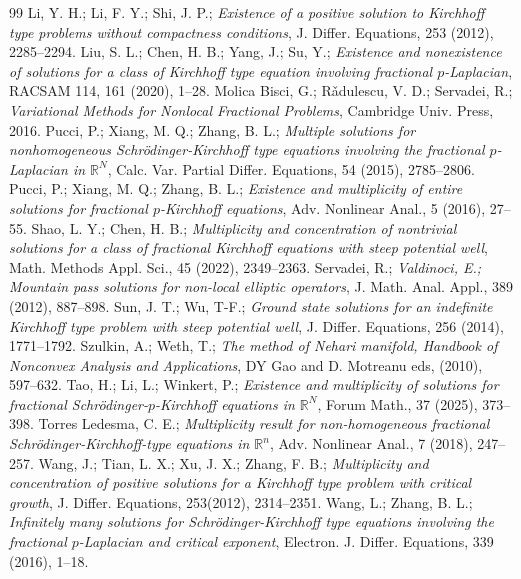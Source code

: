 \documentclass[10pt,a4paper]{amsart}
\numberwithin{equation}{section}
\begin{document}
\begin{thebibliography}{99}
 Li, Y. H.; Li, F. Y.; Shi, J. P.; \emph{Existence of a positive solution to Kirchhoff type problems without compactness conditions}, J. Differ. Equations, 253 (2012), 2285--2294.
 Liu, S. L.; Chen, H. B.; Yang, J.; Su, Y.; \emph{Existence and nonexistence of solutions for a class of Kirchhoff type equation involving fractional $p$-Laplacian}, RACSAM 114, 161 (2020), 1--28.
 Molica Bisci, G.; R\v{a}dulescu, V. D.; Servadei, R.; \emph{Variational Methods for Nonlocal Fractional Problems}, Cambridge Univ. Press, 2016.
 Pucci, P.; Xiang, M. Q.; Zhang, B. L.; \emph{Multiple solutions for nonhomogeneous Schr\"{o}dinger-Kirchhoff type equations involving the fractional $p$-Laplacian in $\mathbb{R}^N$}, Calc. Var. Partial Differ. Equations, 54 (2015), 2785--2806.
 Pucci, P.; Xiang, M. Q.; Zhang, B. L.; \emph{Existence and multiplicity of entire solutions for fractional $p$-Kirchhoff equations}, Adv. Nonlinear Anal., 5 (2016), 27--55.
 Shao, L. Y.; Chen, H. B.; \emph{Multiplicity and concentration of nontrivial solutions for a class of fractional Kirchhoff equations with steep potential well}, Math. Methods Appl. Sci., 45 (2022), 2349--2363.
 Servadei, R.; \emph{Valdinoci, E.; Mountain pass solutions for non-local elliptic operators}, J. Math. Anal. Appl., 389 (2012), 887--898.
 Sun, J. T.; Wu, T-F.; \emph{Ground state solutions for an indefinite Kirchhoff type problem with steep potential well}, J. Differ. Equations, 256 (2014), 1771--1792.
 Szulkin, A.; Weth, T.; \emph{The method of Nehari manifold, Handbook of Nonconvex Analysis and Applications}, DY Gao and D. Motreanu eds, (2010), 597--632.
 Tao, H.; Li, L.; Winkert, P.; \emph{Existence and multiplicity of solutions for fractional Schr\"{o}dinger-$p$-Kirchhoff equations in $\mathbb{R}^N$}, Forum Math., 37 (2025), 373--398.
 Torres Ledesma, C. E.; \emph{Multiplicity result for non-homogeneous fractional Schr\"{o}dinger-Kirchhoff-type equations in $\mathbb{R}^n$}, Adv. Nonlinear Anal., 7 (2018), 247--257.
 Wang, J.; Tian, L. X.; Xu, J. X.; Zhang, F. B.; \emph{Multiplicity and concentration of positive solutions for a Kirchhoff type problem with critical growth}, J. Differ. Equations, 253(2012), 2314--2351.
 Wang, L.; Zhang, B. L.; \emph{Infinitely many solutions for Schr\"{o}dinger-Kirchhoff type equations involving the fractional $p$-Laplacian and critical exponent}, Electron. J. Differ. Equations, 339 (2016), 1--18.

\end{thebibliography}
\end{document}
